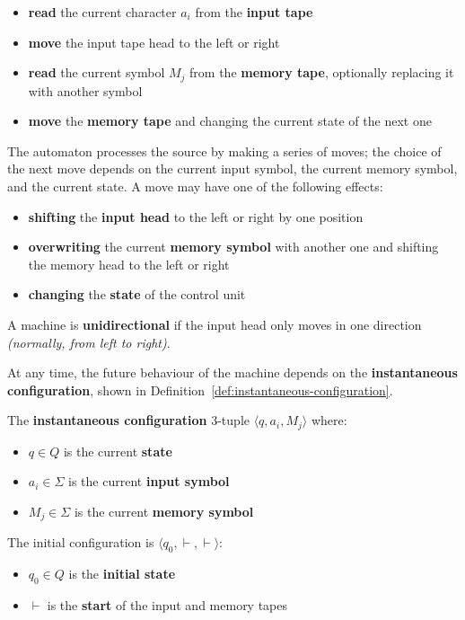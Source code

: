 \documentclass[english]{article}
\begin{document}
\begin{itemize}
  \item \textbf{read} the current character \(a_i\) from the \textbf{input tape}
  \item \textbf{move} the input tape head to the left or right
  \item \textbf{read} the current symbol \(M_j\) from the \textbf{memory tape}, optionally replacing it with another symbol
  \item \textbf{move} the \textbf{memory tape} and changing the current state of the next one
\end{itemize}

The automaton processes the source by making a series of moves;
the choice of the next move depends on the current input symbol, the current memory symbol, and the current state.
A move may have one of the following effects:

\begin{itemize}
  \item \textbf{shifting} the \textbf{input head} to the left or right by one position
  \item \textbf{overwriting} the current \textbf{memory symbol} with another one and shifting the memory head to the left or right
  \item \textbf{changing} the \textbf{state} of the control unit
\end{itemize}

A machine is \textbf{unidirectional} if the input head only moves in one direction \textit{(normally, from left to right)}.

\bigskip
At any time, the future behaviour of the machine depends on the \textbf{instantaneous configuration}, shown in Definition~\ref{def:instantaneous-configuration}.

\begin{definition}
  \label{def:instantaneous-configuration}
  The \textbf{instantaneous configuration} \(3\)-tuple \(\langle q, a_i, M_j \rangle\) where:

  \begin{itemize}
    \item \(q \in Q\) is the current \textbf{state}
    \item  \(a_i \in \Sigma\) is the current \textbf{input symbol}
    \item \(M_j \in \Sigma\) is the current \textbf{memory symbol}
  \end{itemize}

  The initial configuration is \(\langle q_0, \vdash, \vdash \rangle\):

  \begin{itemize}
    \item \(q_0 \in Q\) is the \textbf{initial state}
    \item \(\vdash\) is the \textbf{start} of the input and memory tapes
  \end{itemize}
\end{definition}
\end{document}
